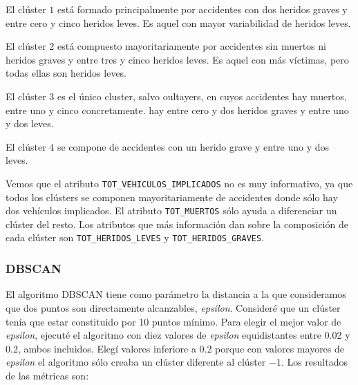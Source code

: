 \documentclass[a4]{article}
\begin{document}
El clúster $1$ está formado principalmente por accidentes con dos heridos graves y entre cero y cinco heridos leves. Es aquel con mayor variabilidad de heridos leves.

El clúster $2$ está compuesto mayoritariamente por accidentes sin muertos ni heridos graves y entre tres y cinco heridos leves. Es aquel con más víctimas, pero todas ellas son heridos leves.

El clúster $3$ es el único cluster, salvo oultayers, en cuyos accidentes hay muertos, entre uno y cinco concretamente. hay entre cero y dos heridos graves y entre uno y dos leves.

El clúster $4$ se compone de accidentes con un herido grave y entre uno y dos leves.

Vemos que el atributo \texttt{TOT\_VEHICULOS\_IMPLICADOS} no es muy informativo, ya que todos los clústers se componen mayoritariamente de accidentes donde sólo hay dos vehículos implicados. El atributo \texttt{TOT\_MUERTOS} sólo ayuda a diferenciar un clúster del resto. Los atributos que más información dan sobre la composición de cada clúster son \texttt{TOT\_HERIDOS\_LEVES} y \texttt{TOT\_HERIDOS\_GRAVES}.

\subsubsection{DBSCAN}

El algoritmo DBSCAN tiene como parámetro la distancia a la que consideramos que dos puntos son directamente alcanzables, \textit{epsilon}. Consideré que un clúster tenía que estar constituido por 10 puntos mínimo. Para elegir el mejor valor de \textit{epsilon}, ejecuté el algoritmo con diez valores de \textit{epsilon} equidistantes entre 0.02 y 0.2, ambos incluidos. Elegí valores inferiore a 0.2 porque con valores mayores de \textit{epsilon} el algoritmo sólo creaba un clúster diferente al clúster $-1$.  Los resultados de las métricas son:
\end{document}
